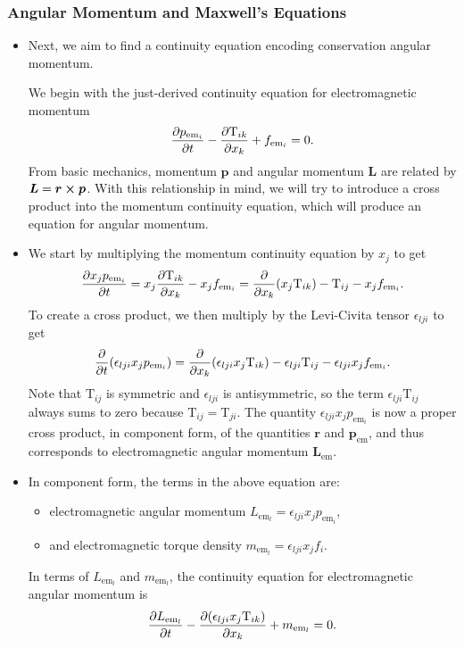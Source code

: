 \documentclass[11pt, a4paper]{article}
\renewcommand{\vec}[1]{\bm{#1}} %
\renewcommand{\r}{\vec{r}}
\newcommand{\TT}{\mathrm{T}}  %
\newcommand{\e}{\epsilon}
\begin{document}
\subsubsection{Angular Momentum and Maxwell's Equations}
\begin{itemize}
	\item Next, we aim to find a continuity equation encoding conservation angular momentum. 

    We begin with the just-derived continuity equation for electromagnetic momentum
	\begin{equation*}
		\pdv{p_{\text{em}_{i}}}{t} - \pdv{\TT_{ik}}{x_{k}} + f_{\text{em}_{i}} = 0.
	\end{equation*}
	From basic mechanics, momentum $ \vec{p} $ and angular momentum $ \vec{L} $ are related by $ \vec{L} = \r \cross \vec{p} $. With this relationship in mind, we will try to introduce a cross product into the momentum continuity equation, which will produce an equation for angular momentum.
	
	\item We start by multiplying the momentum continuity equation by $ x_{j} $ to get
	\begin{equation*}
		\pdv{x_{j}p_{\text{em}_{i}}}{t} = x_{j} \pdv{\TT_{ik}}{x_{k}} - x_{j}f_{\text{em}_{i}} = \pdv{x_{k}}(x_{j}\TT_{ik}) - \TT_{ij} - x_{j}f_{\text{em}_{i}}.
	\end{equation*}
	To create a cross product, we then multiply by the Levi-Civita tensor $ \e_{lji}  $ to get
	\begin{equation*}
		\pdv{t}(\e_{lji}x_{j}p_{\text{em}_{i}}) = \pdv{x_{k}}(\e_{lji}x_{j}\TT_{ik}) - \e_{lji}\TT_{ij} - \e_{lji}x_{j}f_{\text{em}_{i}}.
	\end{equation*}
	Note that $ \TT_{ij} $ is symmetric and $ \e_{lji} $ is antisymmetric, so the term $ \e_{lji}\TT_{ij} $ always sums to zero because $ \TT_{ij} = \TT_{ji} $. The quantity $ \e_{lji}x_{j}p_{\text{em}_{i}} $ is now a proper cross product, in component form, of the quantities $ \r $ and $ \vec{p}_{\text{em}} $, and thus corresponds to electromagnetic angular momentum $ \vec{L}_{\text{em}} $.
	
	\item In component form, the terms in the above equation are:
    \begin{itemize}
        \item electromagnetic angular momentum $ L_{\text{em}_{l}} = \e_{lji}x_{j}p_{\text{em}_{i}} $,

        \item and electromagnetic torque density $ m_{\text{em}_{l}} = \e_{lji}x_{j}f_{i} $.
    \end{itemize}
	In terms of $ L_{\text{em}_{l}} $ and $ m_{\text{em}_{l}} $, the continuity equation for electromagnetic angular momentum is
	\begin{equation*}
		\pdv{L_{\text{em}_{l}}}{t} - \pdv{(\e_{lji} x_{j}\TT_{ik})}{x_{k}} + m_{\text{em}_{l}} = 0.
	\end{equation*}
	

\end{itemize}
\end{document}

